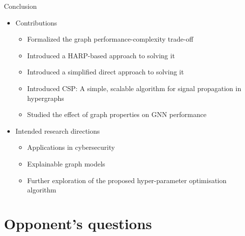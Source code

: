 \documentclass[10pt]{beamer}
\begin{document}
\begin{frame}{Conclusion}
	\begin{itemize}
		\item Contributions
		\begin{itemize}
			\item Formalized the graph performance-complexity trade-off
			\item Introduced a HARP-based approach to solving it
			\item Introduced a simplified direct approach to solving it
			\item Introduced CSP: A simple, scalable algorithm for signal propagation in hypergraphs
			\item Studied the effect of graph properties on GNN performance
		\end{itemize}
		\item Intended research directions
		\begin{itemize}
			\item Applications in cybersecurity
			\item Explainable graph models
			\item Further exploration of the proposed hyper-parameter optimisation algorithm
		\end{itemize}
	\end{itemize}
\end{frame}

\begin{frame}
	\titlepage
\end{frame}

\appendix

\section{Opponent's questions}
\end{document}
